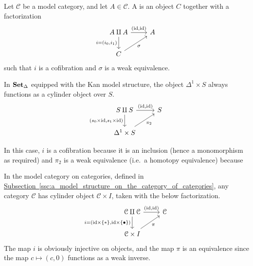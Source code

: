 \documentclass[main.tex]{subfiles}
\begin{document}
\begin{definition}
  \label{def:cylinder_object}
  Let $\mathcal{C}$ be a model category, and let $A \in \mathcal{C}$. A  is an object $C$ together with a factorization
  \begin{equation*}
    \begin{tikzcd}
      A \amalg A
      \arrow[r, "{(\id, \id)}"]
      \arrow[d, swap, "{i = (i_{0}, i_{1})}"]
      & A
      \\
      C
      \arrow[ur, swap, "\sigma"]
    \end{tikzcd}
  \end{equation*}
  such that $i$ is a cofibration and $\sigma$ is a weak equivalence.
\end{definition}

\begin{example}
  In $\operatorname{\mathbf{Set}_{\Delta}}$ equipped with the Kan model structure, the object $\Delta^{1} \times S$ always functions as a cylinder object over $S$.
  \begin{equation*}
    \begin{tikzcd}
      S \amalg S
      \arrow[r, "{(\id, \id)}"]
      \arrow[d, swap, "{(s_{0} \times \id, s_{1} \times \id)}"]
      & S
      \\
      \Delta^{1} \times S
      \arrow[ur, swap, "\pi_{2}"]
    \end{tikzcd}
  \end{equation*}

  In this case, $i$ is a cofibration because it is an inclusion (hence a monomorphism as required) and $\pi_{2}$ is a weak equivalence (i.e.\ a homotopy equivalence) because
\end{example}

\begin{example}
  \label{eg:cylinder_objects_in_model_structure_on_cat}
  In the model category on categories, defined in \hyperref[ssc:a_model_structure_on_the_category_of_categories]{Subsection~\ref*{ssc:a_model_structure_on_the_category_of_categories}}, any category $\mathcal{C}$ has cylinder object $\mathcal{C} \times I$, taken with the below factorization.
  \begin{equation*}
    \begin{tikzcd}
      \mathcal{C} \amalg \mathcal{C}
      \arrow[d, swap, "i = {(\id \times \{*\}, \id \times \{\bullet\})}"]
      \arrow[r, "{(\id, \id)}"]
      & \mathcal{C}
      \\
      \mathcal{C} \times I
      \arrow[ur, swap, "\pi"]
    \end{tikzcd}
  \end{equation*}
  The map $i$ is obviously injective on objects, and the map $\pi$ is an equivalence since the map $c \mapsto (c, 0)$ functions as a weak inverse.
\end{example}
\end{document}
